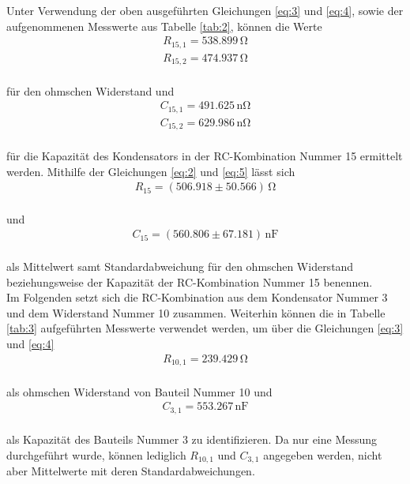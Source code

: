 Unter Verwendung der oben ausgeführten Gleichungen \ref{eq:3} und \ref{eq:4}, sowie der aufgenommenen
Messwerte aus Tabelle \ref{tab:2}, können die Werte 
\begin{align}
R_{15,1} = 538.899\,\si{\ohm} \nonumber \\
R_{15,2} = 474.937\,\si{\ohm} \nonumber  
\end{align}
\\
für den ohmschen Widerstand und
\begin{align}
C_{15,1} = 491.625\,\si{\nano\ohm} \nonumber \\
C_{15,2} = 629.986\,\si{\nano\ohm} \nonumber 
\end{align}
\\
für die Kapazität des Kondensators in der RC-Kombination Nummer 15 ermittelt werden.
Mithilfe der Gleichungen \ref{eq:2} und \ref{eq:5}
lässt sich 
\begin{align}
R_{15} = (506.918 \pm 50.566)\, \si{\ohm} \nonumber 
\end{align}
\\
und
\begin{align}
C_{15} = (560.806 \pm 67.181)\, \si{\nano\farad} \nonumber 
\end{align}
\\
als Mittelwert samt Standardabweichung für den ohmschen Widerstand beziehungsweise der
Kapazität der RC-Kombination Nummer 15 benennen.
\\
Im Folgenden setzt sich die RC-Kombination aus dem Kondensator Nummer 3 und dem Widerstand Nummer 10 zusammen. Weiterhin 
können die in Tabelle \ref{tab:3} aufgeführten Messwerte verwendet werden, um über die Gleichungen
\ref{eq:3} und \ref{eq:4}
\begin{align}
R_{10,1} = 239.429\, \si{\ohm} \nonumber
\end{align}
\\
als ohmschen Widerstand von Bauteil Nummer 10 und
\begin{align}
C_{3,1} = 553.267\, \si{\nano\farad} \nonumber
\end{align}
\\
als Kapazität des Bauteils Nummer 3 zu identifizieren. Da nur eine Messung durchgeführt wurde, können lediglich $R_{10,1}$
und $C_{3,1}$ angegeben werden, nicht aber Mittelwerte mit deren Standardabweichungen.


